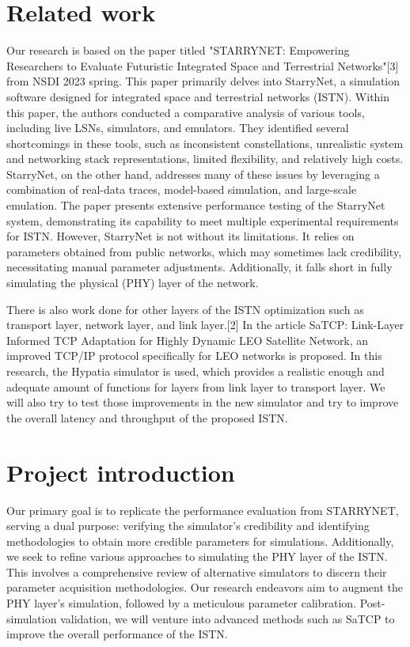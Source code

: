 \documentclass[conference]{IEEEtran}
\begin{document}
\section{Related work}
Our research is based on the paper titled "STARRYNET: Empowering Researchers to Evaluate Futuristic Integrated Space and Terrestrial Networks"[3] from NSDI 2023 spring. This paper primarily delves into StarryNet, a simulation software designed for integrated space and terrestrial networks (ISTN). Within this paper, the authors conducted a comparative analysis of various tools, including live LSNs, simulators, and emulators. They identified several shortcomings in these tools, such as inconsistent constellations, unrealistic system and networking stack representations, limited flexibility, and relatively high costs. StarryNet, on the other hand, addresses many of these issues by leveraging a combination of real-data traces, model-based simulation, and large-scale emulation. The paper presents extensive performance testing of the StarryNet system, demonstrating its capability to meet multiple experimental requirements for ISTN. However, StarryNet is not without its limitations. It relies on parameters obtained from public networks, which may sometimes lack credibility, necessitating manual parameter adjustments. Additionally, it falls short in fully simulating the physical (PHY) layer of the network.

There is also work done for other layers of the ISTN optimization such as transport layer, network layer, and link layer.[2] In the article SaTCP: Link-Layer Informed TCP Adaptation for Highly Dynamic LEO Satellite Network, an improved TCP/IP protocol specifically for LEO networks is proposed. In this research, the Hypatia simulator is used, which provides a realistic enough and adequate amount of functions for layers from link layer to transport layer. We will also try to test those improvements in the new simulator and try to improve the overall latency and throughput of the proposed ISTN.



\section{Project introduction}
Our primary goal is to replicate the performance evaluation from STARRYNET, serving a dual purpose: verifying the simulator's credibility and identifying methodologies to obtain more credible parameters for simulations. Additionally, we seek to refine various approaches to simulating the PHY layer of the ISTN. This involves a comprehensive review of alternative simulators to discern their parameter acquisition methodologies. Our research endeavors aim to augment the PHY layer's simulation, followed by a meticulous parameter calibration. Post-simulation validation, we will venture into advanced methods such as SaTCP to improve the overall performance of the ISTN.
\end{document}
